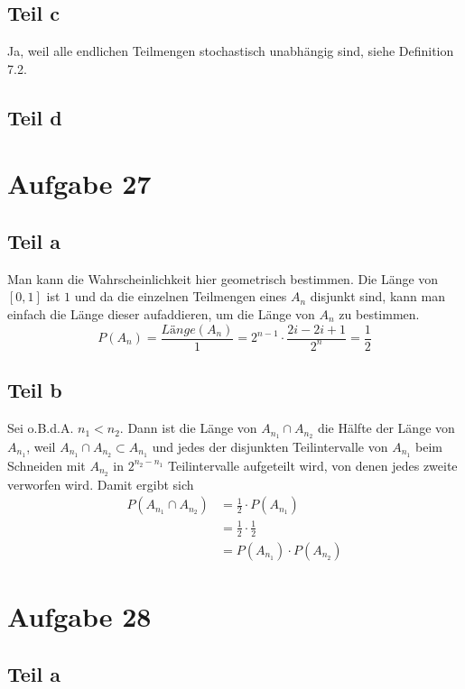 \documentclass[10pt,a4paper]{article}
\begin{document}
\subsection{Teil c}
Ja, weil alle endlichen Teilmengen stochastisch unabhängig sind, siehe Definition 7.2.

\subsection{Teil d}


\section{Aufgabe 27}

\subsection{Teil a}
Man kann die Wahrscheinlichkeit hier geometrisch bestimmen.
Die Länge von $[0, 1]$ ist $1$ und da die einzelnen Teilmengen eines $A_{n}$ disjunkt sind, kann man einfach die Länge dieser aufaddieren, um die Länge von $A_{n}$ zu bestimmen.
\begin{equation}
  P(A_{n}) = \frac{\textit{Länge}(A_{n})}{1} = 2^{n - 1} \cdot \frac{2i - 2i + 1}{2^{n}} = \frac{1}{2}
\end{equation}

\subsection{Teil b}
Sei o.B.d.A. $n_{1} < n_{2}$.
Dann ist die Länge von $A_{n_{1}} \cap A_{n_{2}}$ die Hälfte der Länge von $A_{n_{1}}$, weil $A_{n_{1}} \cap A_{n_{2}} \subset A_{n_{1}}$ und jedes der disjunkten Teilintervalle von $A_{n_{1}}$ beim Schneiden mit $A_{n_{2}}$ in $2^{n_{2} - n_{1}}$ Teilintervalle aufgeteilt wird, von denen jedes zweite verworfen wird.
Damit ergibt sich
\begin{align*}
  P(A_{n_{1}} \cap A_{n_{2}}) & = \frac{1}{2} \cdot P(A_{n_{1}})\\
  & = \frac{1}{2} \cdot \frac{1}{2}\\
  & = P(A_{n_{1}}) \cdot P(A_{n_{2}})
\end{align*}

\section{Aufgabe 28}

\subsection{Teil a}
\end{document}
